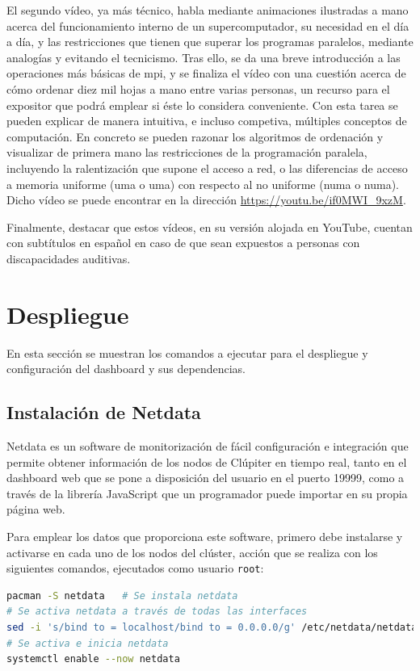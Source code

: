 El segundo vídeo, ya más técnico, habla mediante animaciones ilustradas a mano acerca del funcionamiento interno de un supercomputador, su necesidad en el día a día, y las restricciones que tienen que superar los programas paralelos, mediante analogías y evitando el tecnicismo. Tras ello, se da una breve introducción a las operaciones más básicas de \acrshort{mpi}, y se finaliza el vídeo con una cuestión acerca de cómo ordenar diez mil hojas a mano entre varias personas, un recurso para el expositor que podrá emplear si éste lo considera conveniente. Con esta tarea se pueden explicar de manera intuitiva, e incluso competiva, múltiples conceptos de computación. En concreto se pueden razonar los algoritmos de ordenación y visualizar de primera mano las restricciones de la programación paralela, incluyendo la ralentización que supone el acceso a red, o las diferencias de acceso a memoria uniforme (\acrshort{uma} o \acrlong{uma}) con respecto al no uniforme (\acrshort{numa} o \acrlong{numa}). Dicho vídeo se puede encontrar en la dirección \url{https://youtu.be/if0MWI_9xzM}.

Finalmente, destacar que estos vídeos, en su versión alojada en YouTube, cuentan con subtítulos en español en caso de que sean expuestos a personas con discapacidades auditivas.

\section{Despliegue}
En esta sección se muestran los comandos a ejecutar para el despliegue y configuración del dashboard y sus dependencias.

\subsection{Instalación de Netdata}
Netdata es un software de monitorización de fácil configuración e integración que permite obtener información de los nodos de Clúpiter en tiempo real, tanto en el dashboard web que se pone a disposición del usuario en el puerto 19999, como a través de la librería JavaScript que un programador puede importar en su propia página web.

Para emplear los datos que proporciona este software, primero debe instalarse y activarse en cada uno de los nodos del clúster, acción que se realiza con los siguientes comandos, ejecutados como usuario \texttt{root}:

\begin{lstlisting}[language=bash]
pacman -S netdata   # Se instala netdata
# Se activa netdata a través de todas las interfaces
sed -i 's/bind to = localhost/bind to = 0.0.0.0/g' /etc/netdata/netdata.conf
# Se activa e inicia netdata
systemctl enable --now netdata
\end{lstlisting}

